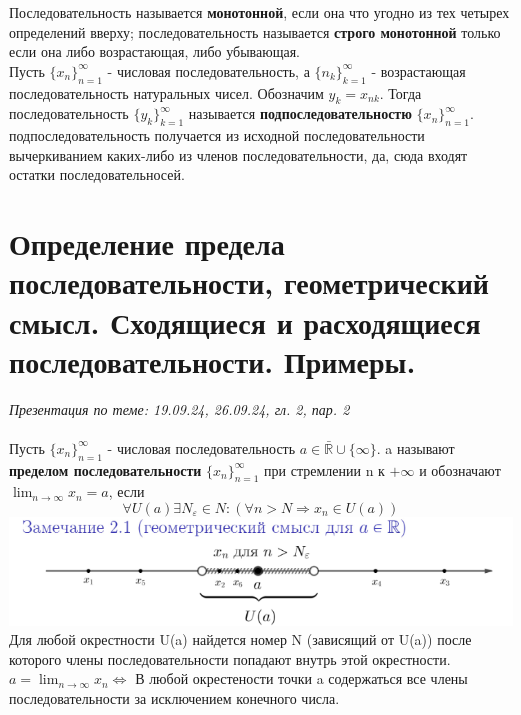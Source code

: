 \documentclass[10pt, a4paper,twocolumn]{article}
\begin{document}
Последовательность называется \textbf{монотонной}, если она что угодно из тех четырех определений вверху; последовательность называется \textbf{строго монотонной} только если она либо возрастающая, либо убывающая.
\\Пусть $\{x_{n}\}^{\infty}_{n = 1}$ - числовая последовательность, а $\{n_{k}\}^{\infty}_{k = 1}$ - возрастающая последовательность натуральных чисел. Обозначим $y_{k} = x_{nk}$. Тогда последовательность $\{y_{k}\}^{\infty}_{k = 1}$ называется \textbf{подпоследовательностю} $\{x_{n}\}^{\infty}_{n = 1}$. подпоследовательность получается из исходной последовательности вычеркиванием каких-либо из членов последовательности, да, сюда входят остатки последовательносей.

\section{Определение предела последовательности, геометрический смысл. Сходящиеся и расходящиеся последовательности. Примеры.}
\textsl{Презентация по теме: 19.09.24, 26.09.24, гл. 2, пар. 2}
\\ \\ Пусть $\{x_{n}\}^{\infty}_{n = 1}$ - числовая последовательность $a \in \bar{\mathbb{R}} \cup \{\infty\}$. a называют \textbf{пределом последовательности} $\{x_{n}\}^{\infty}_{n = 1}$ при стремлении n к $+ \infty$ и обозначают $\lim_{n \to \infty} x_{n} = a$, если 
$$\forall U(a) \exists N_{\varepsilon} \in N : (\forall n > N \Rightarrow x_{n} \in U(a))$$
\includegraphics[width=1\linewidth]{predelposl}
\\ Для любой окрестности U(a) найдется номер N (зависящий от U(a)) после которого члены последовательности попадают внутрь этой окрестности. 
\\ $a = \lim_{n \to \infty} x_n \Leftrightarrow$ В любой окрестености точки a содержаться все члены последовательности за исключением конечного числа.
\end{document}

